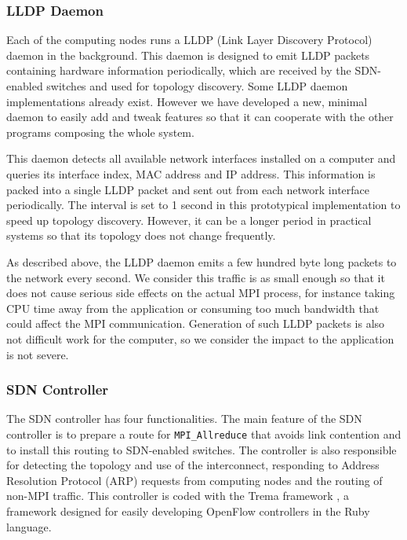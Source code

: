 \hypertarget{lldp-daemon}{%
\subsubsection{LLDP Daemon}\label{lldp-daemon}}

Each of the computing nodes runs a LLDP (Link Layer Discovery Protocol)
\cite{lldp} daemon in the background. This daemon is designed to emit
LLDP packets containing hardware information periodically, which are
received by the SDN-enabled switches and used for topology discovery.
Some LLDP daemon implementations \cite{lldpd,openlldpd} already exist.
However we have developed a new, minimal daemon to easily add and tweak
features so that it can cooperate with the other programs composing the
whole system.

This daemon detects all available network interfaces installed on a
computer and queries its interface index, MAC address and IP address.
This information is packed into a single LLDP packet and sent out from
each network interface periodically. The interval is set to 1 second in
this prototypical implementation to speed up topology discovery.
However, it can be a longer period in practical systems so that its
topology does not change frequently.

As described above, the LLDP daemon emits a few hundred byte long
packets to the network every second. We consider this traffic is as
small enough so that it does not cause serious side effects on the
actual MPI process, for instance taking CPU time away from the
application or consuming too much bandwidth that could affect the MPI
communication. Generation of such LLDP packets is also not difficult
work for the computer, so we consider the impact to the application is
not severe.

\hypertarget{sdn-controller}{%
\subsubsection{SDN Controller}\label{sdn-controller}}

The SDN controller has four functionalities. The main feature of the SDN
controller is to prepare a route for \texttt{MPI\_Allreduce} that avoids
link contention and to install this routing to SDN-enabled switches. The
controller is also responsible for detecting the topology and use of the
interconnect, responding to Address Resolution Protocol (ARP) requests
from computing nodes and the routing of non-MPI traffic. This controller
is coded with the Trema framework \cite{trema}, a framework designed for
easily developing OpenFlow controllers in the Ruby \cite{ruby} language.

